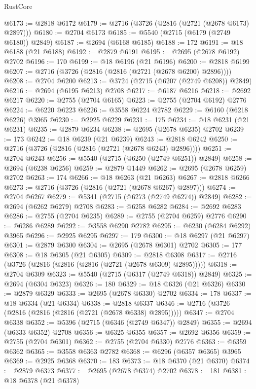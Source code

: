 \begin{lexlean}{RustCore}
\begin{coremodule}
@6173 := @2818 @6172
@6179 := @2716 (@3726 (@2816 (@2721 (@2678 @6173) @2897)))
@6180 := @2704 @6173
@6185 := @5540 (@2715 (@6179 (@2749 @6180)) @2849)
@6187 := @2694 (@6168 @6185)
@6188 := 172
@6191 := @18 @6188 (@21 @6188)
@6192 := @2879 @6191
@6195 := @2695 (@2678 @6192) @2702
@6196 := 170
@6199 := @18 @6196 (@21 @6196)
@6200 := @2818 @6199
@6207 := @2716 (@3726 (@2816 (@2816 (@2721 (@2678 @6200) @2896))))
@6208 := @2704 @6200
@6213 := @3724 (@2715 (@6207 (@2749 @6208)) @2849)
@6216 := @2694 (@6195 @6213) @2708
@6217 := @6187 @6216
@6218 := @2692 @6217
@6220 := @2755 (@2704 @6165)
@6223 := @2755 (@2704 @6192) @2776
@6224 := @6220 @6223
@6226 := @3558 @6224 @2782
@6229 := @6160 (@6218 @6226) @3965
@6230 := @2925 @6229
@6231 := 175
@6234 := @18 @6231 (@21 @6231)
@6235 := @2879 @6234
@6238 := @2695 (@2678 @6235) @2702
@6239 := 173
@6242 := @18 @6239 (@21 @6239)
@6243 := @2818 @6242
@6250 := @2716 (@3726 (@2816 (@2816 (@2721 (@2678 @6243) @2896))))
@6251 := @2704 @6243
@6256 := @5540 (@2715 (@6250 (@2749 @6251)) @2849)
@6258 := @2694 (@6238 @6256)
@6259 := @2879 @1449
@6262 := @2695 (@2678 @6259) @2702
@6263 := 174
@6266 := @18 @6263 (@21 @6263)
@6267 := @2818 @6266
@6273 := @2716 (@3726 (@2816 (@2721 (@2678 @6267) @2897)))
@6274 := @2704 @6267
@6279 := @5341 (@2715 (@6273 (@2749 @6274)) @2849)
@6282 := @2694 (@6262 @6279) @2708
@6283 := @6258 @6282
@6284 := @2692 @6283
@6286 := @2755 (@2704 @6235)
@6289 := @2755 (@2704 @6259) @2776
@6290 := @6286 @6289
@6292 := @3558 @6290 @2782
@6295 := @6230 (@6284 @6292) @3965
@6296 := @2925 @6295
@6297 := 179
@6300 := @18 @6297 (@21 @6297)
@6301 := @2879 @6300
@6304 := @2695 (@2678 @6301) @2702
@6305 := 177
@6308 := @18 @6305 (@21 @6305)
@6309 := @2818 @6308
@6317 := @2716 (@3726 (@2816 (@2816 (@2816 (@2721 (@2678 @6309) @2895)))))
@6318 := @2704 @6309
@6323 := @5540 (@2715 (@6317 (@2749 @6318)) @2849)
@6325 := @2694 (@6304 @6323)
@6326 := 180
@6329 := @18 @6326 (@21 @6326)
@6330 := @2879 @6329
@6333 := @2695 (@2678 @6330) @2702
@6334 := 178
@6337 := @18 @6334 (@21 @6334)
@6338 := @2818 @6337
@6346 := @2716 (@3726 (@2816 (@2816 (@2816 (@2721 (@2678 @6338) @2895)))))
@6347 := @2704 @6338
@6352 := @5396 (@2715 (@6346 (@2749 @6347)) @2849)
@6355 := @2694 (@6333 @6352) @2708
@6356 := @6325 @6355
@6357 := @2692 @6356
@6359 := @2755 (@2704 @6301)
@6362 := @2755 (@2704 @6330) @2776
@6363 := @6359 @6362
@6365 := @3558 @6363 @2782
@6368 := @6296 (@6357 @6365) @3965
@6369 := @2925 @6368
@6370 := 183
@6373 := @18 @6370 (@21 @6370)
@6374 := @2879 @6373
@6377 := @2695 (@2678 @6374) @2702
@6378 := 181
@6381 := @18 @6378 (@21 @6378)

\end{coremodule}
\end{lexlean}
